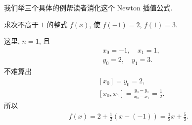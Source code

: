 我们举三个具体的例帮读者消化这个 Newton 插值公式.

\begin{example}
    求次不高于 $1$ 的整式 $f(x)$, 使 $f(-1)=2$, $f(1)=3$.

    这里, $n = 1$, 且
    \begin{align*}
         & x_0 = -1, \quad x_1 = 1, \\
         & y_0 = 2, \quad y_1 = 3.
    \end{align*}
    不难算出
    \begin{align*}
         & [x_0] = y_0 = 2,                                    \\
         & [x_0, x_1] = \frac{y_0 - y_1}{x_0 - x_1} = \frac12.
    \end{align*}
    所以
    \begin{align*}
        f(x) = 2 + \frac12 (x - (-1)) = \frac12 x + \frac52.
    \end{align*}
\end{example}


